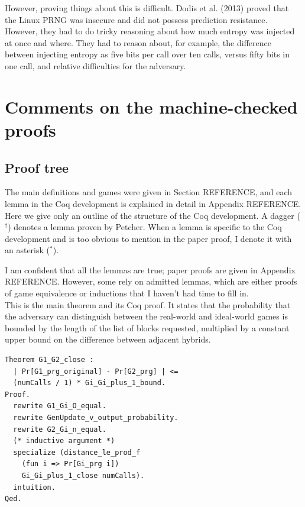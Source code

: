 \documentclass[12pt,lot, lof]{puthesis}
\begin{document}
{However, proving things about this is difficult. Dodis et al. (2013) proved that the Linux PRNG was insecure and did not possess prediction resistance. However, they had to do tricky reasoning about how much entropy was injected at once and where. They had to reason about, for example, the difference between injecting entropy as five bits per call over ten calls, versus fifty bits in one call, and relative difficulties for the adversary. 



\chapter{Comments on the machine-checked proofs} \label{sec:comments_on_the_machine_checked_proofs}

\section{Proof tree} \label{sec:proof_tree}

The main definitions and games were given in Section REFERENCE, and each lemma in the Coq development is explained in detail in Appendix REFERENCE. Here we give only an outline of the structure of the Coq development. A dagger ($^\dag$) denotes a lemma proven by Petcher. When a lemma is specific to the Coq development and is too obvious to mention in the paper proof, I denote it with an asterisk ($^*$). 

I am confident that all the lemmas are true; paper proofs are given in Appendix REFERENCE. However, some rely on admitted lemmas, which are either proofs of game equivalence or inductions that I haven't had time to fill in. \\

This is the main theorem and its Coq proof. It states that the probability that the adversary can distinguish between the real-world and ideal-world games is bounded by the length of the list of blocks requested, multiplied by a constant upper bound on the difference between adjacent hybrids.

\begin{lstlisting}
Theorem G1_G2_close :
  | Pr[G1_prg_original] - Pr[G2_prg] | <= 
  (numCalls / 1) * Gi_Gi_plus_1_bound.
Proof.
  rewrite G1_Gi_O_equal.
  rewrite GenUpdate_v_output_probability.
  rewrite G2_Gi_n_equal.
  (* inductive argument *)
  specialize (distance_le_prod_f 
  	(fun i => Pr[Gi_prg i]) 
	Gi_Gi_plus_1_close numCalls).
  intuition.
Qed.
\end{lstlisting}

}
\end{document}
